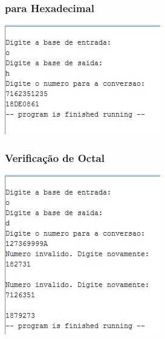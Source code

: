 \documentclass[10pt,a4paper]{article}
\begin{document}
\begin{figure}[H]
\begin{minipage}[t]{.5\textwidth}
\subsubsection{para Hexadecimal}
\includegraphics[width=\textwidth]{OH.jpg}
\end{minipage}
\begin{minipage}[t]{.5\textwidth}
\subsubsection{Verificação de Octal}
\includegraphics[width=\textwidth]{OctalFail.jpg}
\end{minipage}
\end{figure}
\newpage
\end{document}
